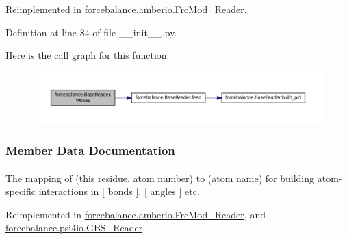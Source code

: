 \-Reimplemented in \hyperlink{classforcebalance_1_1amberio_1_1FrcMod__Reader_a684b946f7faca6589c8ed49e77e31f73}{forcebalance.\-amberio.\-Frc\-Mod\-\_\-\-Reader}.



\-Definition at line 84 of file \-\_\-\-\_\-init\-\_\-\-\_\-.\-py.



\-Here is the call graph for this function\-:\nopagebreak
\begin{figure}[H]
\begin{center}
\leavevmode
\includegraphics[width=350pt]{classforcebalance_1_1BaseReader_af2af8a559625614474a1c6fe245b5e13_cgraph}
\end{center}
\end{figure}




\subsubsection{\-Member \-Data \-Documentation}
\hypertarget{classforcebalance_1_1BaseReader_a2c46ad6b66cf09a30e917ce4a1997e2a}{
\paragraph[{adict}]{}}\label{classforcebalance_1_1BaseReader_a2c46ad6b66cf09a30e917ce4a1997e2a}


\-The mapping of (this residue, atom number) to (atom name) for building atom-\/specific interactions in \mbox{[} bonds \mbox{]}, \mbox{[} angles \mbox{]} etc. 



\-Reimplemented in \hyperlink{classforcebalance_1_1amberio_1_1FrcMod__Reader_ae3b36131778cad32336f88fdb6d724ee}{forcebalance.\-amberio.\-Frc\-Mod\-\_\-\-Reader}, and \hyperlink{classforcebalance_1_1psi4io_1_1GBS__Reader_aa7cbae977f7e9a4e14ba1d45f62bb5fa}{forcebalance.\-psi4io.\-G\-B\-S\-\_\-\-Reader}.



